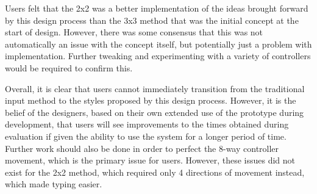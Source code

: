 \documentclass[evaluation.tex]{subfiles}
\begin{document}
Users felt that the 2x2 was a better implementation of the ideas brought
forward by this design process than the 3x3 method that was the initial concept
at the start of design. However, there was some consensus that this was not
automatically an issue with the concept itself, but potentially just a problem
with implementation. Further tweaking and experimenting with a variety of
controllers would be required to confirm this.

Overall, it is clear that users cannot immediately transition from the
traditional input method to the styles proposed by this design process. However,
it is the belief of the designers, based on their own extended use of the
prototype during development, that users will see improvements to the times
obtained during evaluation if given the ability to use the system for a longer
period of time. Further work should also be done in order to perfect the 8-way
controller movement, which is the primary issue for users. However, these
issues did not exist for the 2x2 method, which required only 4 directions of
movement instead, which made typing easier.
\end{document}
